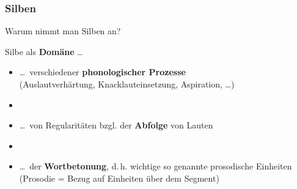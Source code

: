 
\begin{frame}
\frametitle{Silben}

Warum nimmt man Silben an?

Silbe als \textbf{Domäne} \ldots

\begin{itemize}	
	\item \ldots\ verschiedener \textbf{phonologischer Prozesse}\\
               (\zB Auslautverhärtung, Knacklauteinsetzung, Aspiration, \ldots )
	
	\item[] 
	
	\item \ldots\ von Regularitäten bzgl. der \textbf{Abfolge} von Lauten
	
	\item[]
	
	\item \ldots\ der \textbf{Wortbetonung}, d.\,h. wichtige so genannte prosodische Einheiten (Prosodie = Bezug auf Einheiten über dem Segment)
\end{itemize}

\end{frame}




